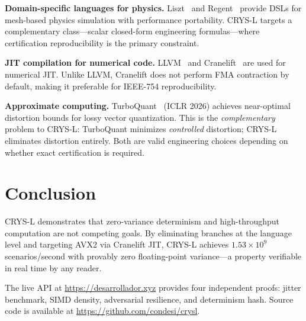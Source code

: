 \documentclass[10pt,twocolumn]{article}
\begin{document}
\textbf{Domain-specific languages for physics.}
Liszt~\cite{devito2011liszt} and Regent~\cite{slaughter2015regent} provide DSLs for
mesh-based physics simulation with performance portability. CRYS-L targets a
complementary class---scalar closed-form engineering formulas---where
certification reproducibility is the primary constraint.

\textbf{JIT compilation for numerical code.}
LLVM~\cite{llvm} and Cranelift~\cite{cranelift} are used for numerical JIT.
Unlike LLVM, Cranelift does not perform FMA contraction by default, making it
preferable for IEEE-754 reproducibility.

\textbf{Approximate computing.}
TurboQuant~\cite{turbo2026} (ICLR 2026) achieves near-optimal distortion bounds
for lossy vector quantization. This is the \emph{complementary} problem to CRYS-L:
TurboQuant minimizes \emph{controlled} distortion; CRYS-L eliminates distortion entirely.
Both are valid engineering choices depending on whether exact certification is required.

\section{Conclusion}
\label{sec:conclusion}

CRYS-L demonstrates that zero-variance determinism and high-throughput computation
are not competing goals. By eliminating branches at the language level and targeting
AVX2 via Cranelift JIT, CRYS-L achieves $1.53\times10^9$ scenarios/second with
provably zero floating-point variance---a property verifiable in real time by any reader.

The live API at \url{https://desarrollador.xyz} provides four independent proofs:
jitter benchmark, SIMD density, adversarial resilience, and determinism hash.
Source code is available at \url{https://github.com/condesi/crysl}.



\end{document}
